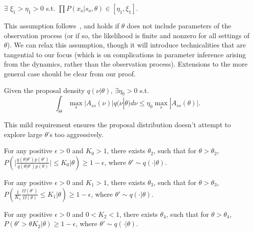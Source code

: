 \begin{assumption}
$\exists$ $ \xi_1 > \eta_1 > 0$ s.t. 
$\prod P(x_o | s_o, \theta) \in [\eta_1, \xi_1]$.
  \label{asmp:obs_bnd}
\end{assumption}
\noindent This assumption follows~\cite{miasojedow2017}, and holds if 
$\theta$ does not include parameters of the observation process (or if so,
the likelihood is finite and nonzero for all settings of $\theta$). We can relax this assumption,
though it will introduce technicalities that are tangential to our focus
(which is on complications in parameter inference arising from the 
dynamics, rather than the observation process). Extensions to the more 
general case should be clear from our proof.

\begin{assumption}
Given the proposal density $q(\nu | \theta)$, $\exists \eta_0 > 0$ s.t. $$ \int_\Theta \max_s|A_{ss}(\nu)| q(\nu | \theta)d\nu \leq \eta_0 \max_s|A_{ss}(\theta)|.$$
\end{assumption}
\noindent This mild requirement ensures the proposal distribution doesn't attempt
to explore large $\theta$'s too aggressively.

\begin{assumption}
For any positive $\epsilon > 0$ and $K_0 > 1$, there exists $\theta_2$, such that for $\theta > \theta_2$, $P(\mid \frac{q(\theta | \theta')p(\theta')}{q(\theta | \theta')p(\theta)}\mid \leq K_0 | \theta) \geq 1 - \epsilon$, where $\theta' \sim q(\cdot | \theta)$.
\end{assumption}

\begin{assumption}
For any positive $\epsilon > 0$ and $K_1 > 1$, there exists $\theta_3$, such that for $\theta > \theta_3$, $P(\frac{1}{K_1}\frac{\Omega(\theta')}{\Omega(\theta)} \leq K_1 | \theta) \geq 1 - \epsilon$, where $\theta' \sim q(\cdot | \theta)$.
\end{assumption}
\begin{assumption}
For any positive $\epsilon > 0$ and $0 < K_2 < 1$, there exists $\theta_4$, such that for $\theta > \theta_4$, $P(\theta' > \theta K_2 | \theta) \geq 1 - \epsilon$, where $\theta' \sim q(\cdot | \theta)$.
\end{assumption}


